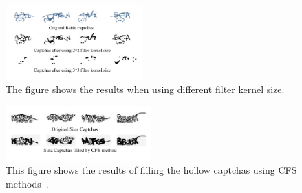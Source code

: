 \begin{figure}
  \centering
  \includegraphics[width=0.47\textwidth]{fig/preprocessing/proofing_removing_background.pdf}
  \caption{The figure shows the results when using different filter kernel size.}
  \label{fig: proofing_removing_background}
\end{figure}

\begin{figure}
  \centering
  \includegraphics[width=0.5\textwidth]{fig/preprocessing/proofing_cfs.pdf}
  \caption{This figure shows the results of filling the hollow captchas using CFS methods~\cite{Yan2008A}.}
  \label{fig: proofing_cfs}
\end{figure}
%

